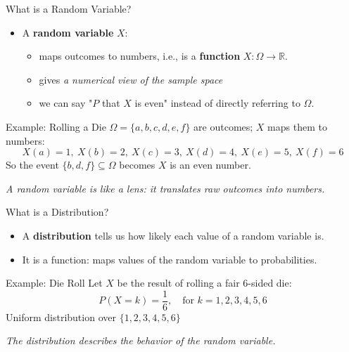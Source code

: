 \documentclass{beamer}
\begin{document}
\begin{frame}{What is a Random Variable?}
  \begin{itemize}
  \item A \textbf{random variable} $X$:
    \begin{itemize}
      \item maps outcomes to numbers, i.e., is a \textbf{function} $X: \Omega \rightarrow \mathbb{R}$.
      \item gives \textit{a numerical view of the sample space}
      \item we can say "$P$ that $X$ is even" instead of directly referring to $\Omega$.
    \end{itemize}
\end{itemize}

\vspace{0.4cm}
\begin{block}{Example: Rolling a Die}
$\Omega = \{a, b, c, d, e, f\}$ are outcomes; $X$ maps them to numbers:
\[
X(a)=1,\ X(b)=2,\ X(c)=3,\ X(d)=4,\ X(e)=5,\ X(f)=6
\]
So the event $\{b, d, f\} \subseteq \Omega$ becomes $X$ is an even number.
\end{block}
\vspace{0.2cm}
\begin{center}
\textit{A random variable is like a lens: it translates raw outcomes into numbers.}
\end{center}
\end{frame}


\begin{frame}{What is a Distribution?}
\begin{itemize}
  \item A \textbf{distribution} tells us how likely each value of a random variable is.
  \item It is a function: maps values of the random variable to probabilities.
\end{itemize}

\vspace{0.3cm}
\begin{block}{Example: Die Roll}
Let $X$ be the result of rolling a fair 6-sided die:
\[
P(X = k) = \frac{1}{6}, \quad \text{for } k = 1,2,3,4,5,6
\]
Uniform distribution over $\{1, 2, 3, 4, 5, 6\}$
\end{block}

\vspace{0.2cm}
\begin{center}
\textit{The distribution describes the behavior of the random variable.}
\end{center}

\end{frame}
\end{document}
